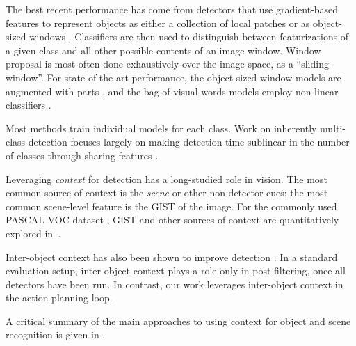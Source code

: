 The best recent performance has come from detectors that use gradient-based features to represent objects as either a collection of local patches or as object-sized windows \cite{Dalal2005,Lowe2004}.
Classifiers are then used to distinguish between featurizations of a given class and all other possible contents of an image window.
Window proposal is most often done exhaustively over the image space, as a ``sliding window''.
For state-of-the-art performance, the object-sized window models are augmented with parts \cite{Felzenszwalb2010a}, and the bag-of-visual-words models employ non-linear classifiers \cite{Vedaldi2009}.


Most methods train individual models for each class.
Work on inherently multi-class detection focuses largely on making detection time sublinear in the number of classes through sharing features \cite{Torralba2007,Fan2005}.


Leveraging \emph{context} for detection has a long-studied role in vision.
The most common source of context is the \emph{scene} or other non-detector cues; the most common scene-level feature is the GIST \cite{Oliva2001a} of the image.
For the commonly used PASCAL VOC dataset \cite{pascal-voc-2010}, GIST and other sources of context are quantitatively explored in~\cite{Divvala2009}.

Inter-object context has also been shown to improve detection \cite{Torralba2004}.
In a standard evaluation setup, inter-object context plays a role only in post-filtering, once all detectors have been run.
In contrast, our work leverages inter-object context in the action-planning loop.

A critical summary of the main approaches to using context for object and scene recognition is given in \cite{Galleguillos2010}.

